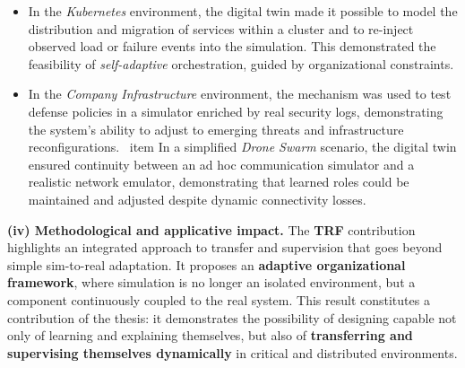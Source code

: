 \begin{itemize}
  \item In the \textit{Kubernetes} environment, the digital twin made it possible to model the distribution and migration of services within a cluster and to re-inject observed load or failure events into the simulation. This demonstrated the feasibility of \textit{self-adaptive} orchestration, guided by organizational constraints.

  \item In the \textit{Company Infrastructure} environment, the mechanism was used to test defense policies in a simulator enriched by real security logs, demonstrating the system's ability to adjust to emerging threats and infrastructure reconfigurations.
        \ item In a simplified \textit{Drone Swarm} scenario, the digital twin ensured continuity between an ad hoc communication simulator and a realistic network emulator, demonstrating that learned roles could be maintained and adjusted despite dynamic connectivity losses.
\end{itemize}
\medskip
\noindent
\textbf{(iv) Methodological and applicative impact.}
The \textbf{TRF} contribution highlights an integrated approach to transfer and supervision that goes beyond simple sim-to-real adaptation.
It proposes an \textbf{adaptive organizational framework}, where simulation is no longer an isolated environment, but a component continuously coupled to the real system.
This result constitutes a contribution of the thesis: it demonstrates the possibility of designing  capable not only of learning and explaining themselves, but also of \textbf{transferring and supervising themselves dynamically} in critical and distributed environments.
